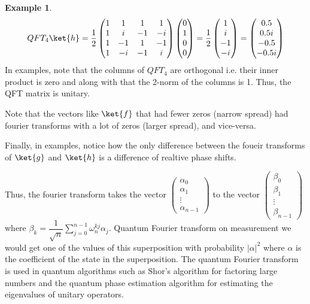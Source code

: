 \documentclass[12pt, oneside]{book}
\theoremstyle{definition}
\theoremstyle{definition}
\newtheorem{example}{Example}[section]
\theoremstyle{remark}
\begin{document}
\begin{example}
    \[ QFT_4\ket{h}=\dfrac{1}{2}\begin{pmatrix} 1 & 1 & 1 & 1 \\ 1 & i & -1 & -i \\ 1 & -1 & 1 & -1 \\ 1 & -i & -1 & i \end{pmatrix}\begin{pmatrix} 0 \\ 1 \\ 0 \\ 0 \end{pmatrix}=\dfrac{1}{2}\begin{pmatrix} 1 \\ i \\ -1 \\ -i \end{pmatrix}=\begin{pmatrix} 0.5 \\ 0.5i \\ -0.5 \\ -0.5i \end{pmatrix} \]
    In examples, note that the columns of $QFT_4$ are orthogonal i.e. their inner product is zero and along with that 
    the 2-norm of the columns is 1. Thus, the QFT matrix is unitary.

    Note that the vectors like $\ket{f}$ that had fewer zeros (narrow spread) had fourier transforms with a lot of zeros (larger spread),
    and vice-versa.

    Finally, in examples, notice how the only difference between the foueir transforms of $\ket{g}$ and $\ket{h}$ is a difference of realtive phase shifts.
\end{example}
Thus, the fourier transform takes the vector $\begin{pmatrix} \alpha_0 \\ \alpha_1 \\ \vdots \\ \alpha_{n-1} \end{pmatrix}$ to the vector $\begin{pmatrix} \beta_0 \\ \beta_1 \\ \vdots \\ \beta_{n-1} \end{pmatrix}$ where $\beta_k=\dfrac{1}{\sqrt{n}}\sum_{j=0}^{n-1}\omega_n^{kj}\alpha_j$.
Quantum Fourier transform on measurement we would get one of the values of this superposition with probability $|\alpha|^2$ where $\alpha$ is the coefficient of the state in the superposition. The quantum Fourier transform is used in quantum algorithms such as Shor's algorithm for factoring large numbers and the quantum phase estimation algorithm for estimating the eigenvalues of unitary operators.\\
\end{document}
